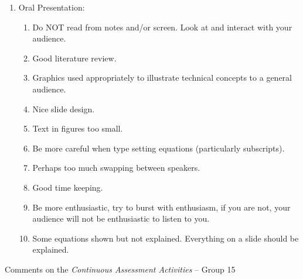 \documentclass[14pt,twoside]{report}
\begin{document}
\begin{enumerate}
\item Oral Presentation:
\begin{enumerate}
%
\item Do NOT read from notes and/or screen. Look at and interact with your audience.
%
\item Good literature review.
%
\item Graphics used appropriately to illustrate technical concepts to a general audience. 
%
\item Nice slide design.
%
\item Text in figures too small.
%
\item Be more careful when type setting equations (particularly subscripts).
%
\item Perhaps too much swapping between speakers.
%
\item Good time keeping.
%
\item Be more enthusiastic, try to burst with enthusiasm, if you are not, your audience will not be enthusiastic to listen to you.
%
\item Some equations shown but not explained. Everything on a slide should be explained.
%
\end{enumerate}

\end{enumerate}


\clearpage



\bigskip

\begin{center}
  {\Large Comments on the {\it Continuous Assessment Activities} -- Group 15}
\end{center}
\end{document}
